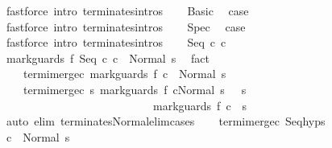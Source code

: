 \begin{isabellebody}
\ {\isacharparenleft}fastforce\ intro{\isacharcolon}\ terminates{\isachardot}intros{\isacharparenright}\isanewline
{}\isamarkupfalse%
\isanewline
\ \ \isamarkupfalse%
\ Basic\ \isamarkupfalse%
\ {\isacharquery}case\ \isamarkupfalse%
\ {\isacharparenleft}fastforce\ intro{\isacharcolon}\ terminates{\isachardot}intros{\isacharparenright}\isanewline
{}\isamarkupfalse%
\isanewline
\ \ \isamarkupfalse%
\ Spec\ \isamarkupfalse%
\ {\isacharquery}case\ \isamarkupfalse%
\ {\isacharparenleft}fastforce\ intro{\isacharcolon}\ terminates{\isachardot}intros{\isacharparenright}\isanewline
{}\isamarkupfalse%
\isanewline
\ \ \isamarkupfalse%
\ {\isacharparenleft}Seq\ c{}\ c{}{\isacharparenright}\ \isanewline
\ \ \isamarkupfalse%
\ {\isachardoublequoteopen}{\isasymGamma}{\isasymturnstile}mark{\isacharunderscore}guards\ f\ {\isacharparenleft}Seq\ c{}\ c{}{\isacharparenright}\ {\isasymdown}\ Normal\ s{\isachardoublequoteclose}\ \isamarkupfalse%
\ fact\isanewline
\ \ \isamarkupfalse%
\ \isamarkupfalse%
\isanewline
\ \ \ \ termi{\isacharunderscore}merge{\isacharunderscore}c{}{\isacharcolon}\ {\isachardoublequoteopen}{\isasymGamma}{\isasymturnstile}mark{\isacharunderscore}guards\ f\ c{}\ {\isasymdown}\ Normal\ s{\isachardoublequoteclose}\ \isanewline
\ \ \ \ termi{\isacharunderscore}merge{\isacharunderscore}c{}{\isacharcolon}\ {\isachardoublequoteopen}{\isasymforall}s{\isacharprime}{\isachardot}\ {\isasymGamma}{\isasymturnstile}{\isasymlangle}mark{\isacharunderscore}guards\ f\ c{}{\isacharcomma}Normal\ s\ {\isasymrangle}\ {\isasymRightarrow}\ s{\isacharprime}\ {\isasymlongrightarrow}\ \isanewline
\ \ \ \ \ \ \ \ \ \ \ \ \ \ \ \ \ \ \ \ \ \ \ \ \ \ \ {\isasymGamma}{\isasymturnstile}mark{\isacharunderscore}guards\ f\ c{}\ {\isasymdown}\ s{\isacharprime}{\isachardoublequoteclose}\isanewline
\ \ \ \ \isamarkupfalse%
\ {\isacharparenleft}auto\ elim{\isacharcolon}\ terminates{\isacharunderscore}Normal{\isacharunderscore}elim{\isacharunderscore}cases{\isacharparenright}\isanewline
\ \ \isamarkupfalse%
\ termi{\isacharunderscore}merge{\isacharunderscore}c{}\ Seq{\isachardot}hyps\isanewline
\ \ \isamarkupfalse%
\ {\isachardoublequoteopen}{\isasymGamma}{\isasymturnstile}c{}\ {\isasymdown}\ Normal\ s{\isachardoublequoteclose}\ \isamarkupfalse%

\end{isabellebody}
